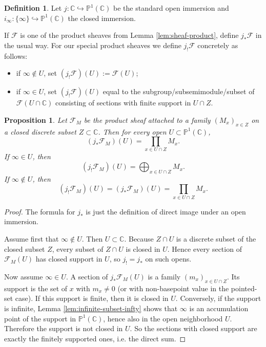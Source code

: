 \documentclass[11pt,a4paper]{article}
\newtheorem{proposition}[theorem]{Proposition}
\theoremstyle{definition}
\newtheorem{definition}[theorem]{Definition}
\theoremstyle{remark}
\newcommand{\CC}{\mathbb C}
\newcommand{\PP}{\mathbb P}
\newcommand{\into}{\hookrightarrow}
\begin{document}
\begin{definition}
Let $j:\CC\into\PP^1(\CC)$ be the standard open immersion and $i_\infty:\{\infty\}\into\PP^1(\CC)$ the closed immersion.

If $\mathcal F$ is one of the product sheaves from Lemma \ref{lem:sheaf-product}, define $j_*\mathcal F$ in the usual way.  For our special product sheaves we define $j_!\mathcal F$ concretely as follows:
\begin{itemize}[leftmargin=2em]
\item if $\infty\notin U$, set $(j_!\mathcal F)(U):=\mathcal F(U)$;
\item if $\infty\in U$, set $(j_!\mathcal F)(U)$ equal to the subgroup/subsemimodule/subset of $\mathcal F(U\cap\CC)$ consisting of sections with finite support in $U\cap Z$.
\end{itemize}
\end{definition}

\begin{proposition}\label{prop:j-star-explicit}
Let $\mathcal F_M$ be the product sheaf attached to a family $(M_x)_{x\in Z}$ on a closed discrete subset $Z\subset\CC$.  Then for every open $U\subset\PP^1(\CC)$,
\[
(j_*\mathcal F_M)(U)=\prod_{x\in U\cap Z} M_x.
\]
If $\infty\in U$, then
\[
(j_!\mathcal F_M)(U)=\bigoplus_{x\in U\cap Z} M_x.
\]
If $\infty\notin U$, then
\[
(j_!\mathcal F_M)(U)=(j_*\mathcal F_M)(U)=\prod_{x\in U\cap Z}M_x.
\]
\end{proposition}

\begin{proof}
The formula for $j_*$ is just the definition of direct image under an open immersion.

Assume first that $\infty\notin U$.  Then $U\subset\CC$.  Because $Z\cap U$ is a discrete subset of the closed subset $Z$, every subset of $Z\cap U$ is closed in $U$.  Hence every section of $\mathcal F_M(U)$ has closed support in $U$, so $j_!=j_*$ on such opens.

Now assume $\infty\in U$.  A section of $j_*\mathcal F_M(U)$ is a family $(m_x)_{x\in U\cap Z}$.  Its support is the set of $x$ with $m_x\neq0$ (or with non-basepoint value in the pointed-set case).  If this support is finite, then it is closed in $U$.  Conversely, if the support is infinite, Lemma \ref{lem:infinite-subset-infty} shows that $\infty$ is an accumulation point of the support in $\PP^1(\CC)$, hence also in the open neighborhood $U$.  Therefore the support is not closed in $U$.  So the sections with closed support are exactly the finitely supported ones, i.e. the direct sum.
\end{proof}
\end{document}
